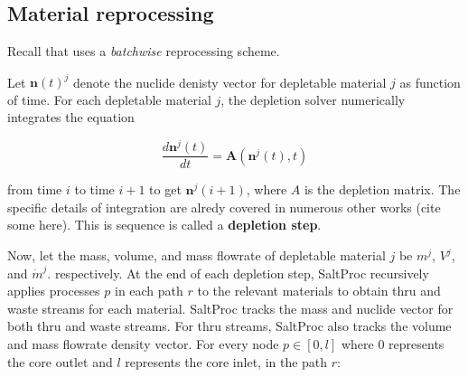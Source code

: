 \subsection{Material reprocessing}
Recall that \SaltProc uses a {\it batchwise} reprocessing scheme.

Let $\mathbf{n}(t)^{j}$ denote the nuclide denisty vector for depletable material
$j$ as function of time. For each depletable material $j$, the depletion solver numerically
integrates the equation

\begin{equation}
    \frac{d\mathbf{n}^{j}(t)}{dt} = \mathbf{A}(\mathbf{n}^{j}(t), t)
\end{equation}

from time $i$ to time $i+1$ to get $\mathbf{n}^{j}(i+1)$, where $A$ is the
depletion matrix. The specific details of integration are alredy covered in
numerous other works (cite some here). This is sequence is called a {\bf depletion
step}.

Now, let the mass, volume, and mass flowrate of depletable material $j$ be
$m^{j}$, $V^{j}$, and $\dot{m}^{j}$. respectively. At the end of each depletion
step, SaltProc recursively applies processes $p$ in each path $r$ to the
relevant materials to obtain thru and waste streams for each material. SaltProc
tracks the mass and nuclide vector for both thru and waste streams. For thru
streams, SaltProc also tracks the volume and mass flowrate density vector. For
every node $p\in[0,l]$ where $0$ represents the core outlet and $l$ represents the core inlet, in the path $r$:

